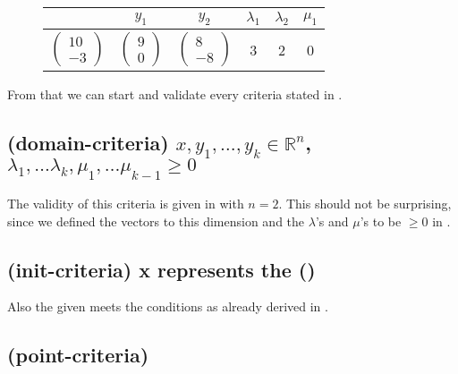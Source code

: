 \begin{figure}[H]
	\label{ex:gna}
	\centering
	\begin{tabular}{|c|c|c|c|c|c|}
		\hline
		\stem & $y_1$ & $y_2$ & $\lambda_1$ & $\lambda_2$ & $\mu_1$ \\ \hline
		$\begin{pmatrix} 10 \\ -3 \end{pmatrix}$ & $\begin{pmatrix} 9 \\ 0 \end{pmatrix}$ & $\begin{pmatrix} 8 \\ -8 \end{pmatrix}$ & 3 & 2 & 0 \\ \hline
	\end{tabular}
\end{figure}
From that we can start and validate every criteria stated in .

	\subsection[Verifying: domain-criteria]{(domain-criteria)	$x, y_1, \dots, y_k \in \mathbb{R}^n$, $\lambda_1, \dots \lambda_k, \mu_1, \dots \mu_{k-1} \ge 0$ }
		The validity of this criteria is given in  with $n=2$. This should not be surprising, since we defined the vectors to this dimension and the $\lambda$'s and $\mu$'s to be $\ge 0$ in .
		
	\subsection[Verifying: init-criteria]{(init-criteria) x represents the \startterm (\stem)}
	Also the given \stem meets the conditions as already derived in .
	
	\newsavebox{\pointcrit}%
	\subsection[Verifying: point-criteria]{(point-criteria) \usebox{\pointcrit} }
	
